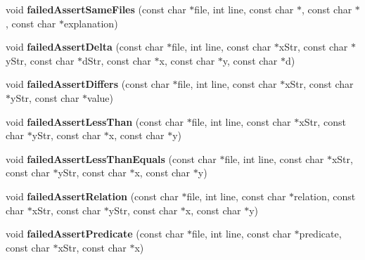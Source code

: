 \begin{DoxyCompactItemize}
\item 
\hypertarget{classCxxTest_1_1XmlFormatter_a9a70a9fcfbb0aab571bce3a3e914df7b}{void {\bfseries failed\-Assert\-Same\-Files} (const char $\ast$file, int line, const char $\ast$, const char $\ast$, const char $\ast$explanation)}\label{classCxxTest_1_1XmlFormatter_a9a70a9fcfbb0aab571bce3a3e914df7b}

\item 
\hypertarget{classCxxTest_1_1XmlFormatter_a4ae20a108771a6267dd118a293f1ba43}{void {\bfseries failed\-Assert\-Delta} (const char $\ast$file, int line, const char $\ast$x\-Str, const char $\ast$y\-Str, const char $\ast$d\-Str, const char $\ast$x, const char $\ast$y, const char $\ast$d)}\label{classCxxTest_1_1XmlFormatter_a4ae20a108771a6267dd118a293f1ba43}

\item 
\hypertarget{classCxxTest_1_1XmlFormatter_acd2668e8a9a042118d54bc647e6d1575}{void {\bfseries failed\-Assert\-Differs} (const char $\ast$file, int line, const char $\ast$x\-Str, const char $\ast$y\-Str, const char $\ast$value)}\label{classCxxTest_1_1XmlFormatter_acd2668e8a9a042118d54bc647e6d1575}

\item 
\hypertarget{classCxxTest_1_1XmlFormatter_a320466dd5997df92b6471416d652ee40}{void {\bfseries failed\-Assert\-Less\-Than} (const char $\ast$file, int line, const char $\ast$x\-Str, const char $\ast$y\-Str, const char $\ast$x, const char $\ast$y)}\label{classCxxTest_1_1XmlFormatter_a320466dd5997df92b6471416d652ee40}

\item 
\hypertarget{classCxxTest_1_1XmlFormatter_ad30e46007902c0a6bc214b350cbe0275}{void {\bfseries failed\-Assert\-Less\-Than\-Equals} (const char $\ast$file, int line, const char $\ast$x\-Str, const char $\ast$y\-Str, const char $\ast$x, const char $\ast$y)}\label{classCxxTest_1_1XmlFormatter_ad30e46007902c0a6bc214b350cbe0275}

\item 
\hypertarget{classCxxTest_1_1XmlFormatter_a8ed05872865d1946aca1311e770cb751}{void {\bfseries failed\-Assert\-Relation} (const char $\ast$file, int line, const char $\ast$relation, const char $\ast$x\-Str, const char $\ast$y\-Str, const char $\ast$x, const char $\ast$y)}\label{classCxxTest_1_1XmlFormatter_a8ed05872865d1946aca1311e770cb751}

\item 
\hypertarget{classCxxTest_1_1XmlFormatter_add72f51d72d1ab7e7aad0e3df25722eb}{void {\bfseries failed\-Assert\-Predicate} (const char $\ast$file, int line, const char $\ast$predicate, const char $\ast$x\-Str, const char $\ast$x)}\label{classCxxTest_1_1XmlFormatter_add72f51d72d1ab7e7aad0e3df25722eb}


\end{DoxyCompactItemize}
